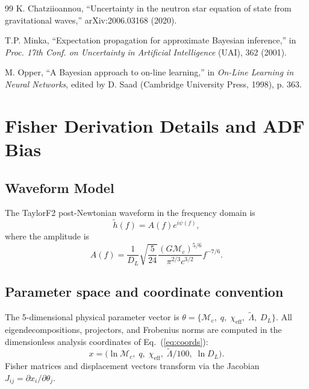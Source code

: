 \documentclass[twocolumn,prd,showpacs,superscriptaddress]{revtex4-2}
\newcommand{\Mchirp}{\mathcal{M}_c}
\newcommand{\Lambdatilde}{\tilde{\Lambda}}
\newcommand{\chieff}{\chi_{\text{eff}}}
\newcommand{\Dl}{D_L}
\newcommand{\eqnref}[1]{Eq.~(\ref{eq:#1})}
\begin{document}
\begin{thebibliography}{99}
K. Chatziioannou,
``Uncertainty in the neutron star equation of state from gravitational waves,''
arXiv:2006.03168 (2020).

T.P. Minka,
``Expectation propagation for approximate Bayesian inference,''
in \emph{Proc. 17th Conf. on Uncertainty in Artificial Intelligence} (UAI), 362 (2001).

M. Opper,
``A Bayesian approach to on-line learning,''
in \emph{On-Line Learning in Neural Networks}, edited by D. Saad (Cambridge University Press, 1998), p. 363.

\end{thebibliography}

\appendix

\section{Fisher Derivation Details and ADF Bias}
\label{sec:appendix}

\subsection{Waveform Model}

The TaylorF2 post-Newtonian waveform in the frequency domain is
\begin{equation}
\tilde{h}(f) = A(f) e^{i\psi(f)},
\label{eq:app_waveform}
\end{equation}
where the amplitude is
\begin{equation}
A(f) = \frac{1}{\Dl} \sqrt{\frac{5}{24}} \frac{(G\Mchirp)^{5/6}}{\pi^{2/3} c^{3/2}} f^{-7/6}.
\label{eq:app_amplitude}
\end{equation}

\subsection{Parameter space and coordinate convention}

The 5-dimensional physical parameter vector is $\theta = \{\Mchirp,\; q,\; \chieff,\; \Lambdatilde,\; \Dl\}$. All eigendecompositions, projectors, and Frobenius norms are computed in the dimensionless analysis coordinates of \eqnref{coords}:
\begin{equation}
x = \bigl(\ln \Mchirp,\; q,\; \chieff,\; \Lambdatilde/100,\; \ln \Dl\bigr).
\end{equation}
Fisher matrices and displacement vectors transform via the Jacobian $J_{ij} = \partial x_i / \partial \theta_j$.
\end{document}
